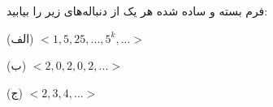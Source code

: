 	\p
	فرم بسته و ساده شده 
	 هر یک از دنباله‌های زیر را بیابید:
			
			(الف) $<1,5,25,...,5^k,...>$
			
			(ب) $< 2,0,2,0,2,...>$
			
								(ج) $<2,3,4,...>$